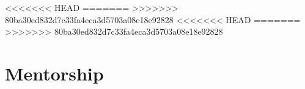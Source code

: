 \documentclass[letterpaper]{article}
\renewenvironment{itemize}{
  \begin{list}{}{
    \setlength{\leftmargin}{1.5em}
  }
}{
  \end{list}
}
\begin{document}
\begin{itemize}
\end{itemize}

<<<<<<< HEAD
=======
>>>>>>> 80ba30ed832d7c33fa4eca3d5703a08e18e92828
<<<<<<< HEAD
% 
=======
%
>>>>>>> 80ba30ed832d7c33fa4eca3d5703a08e18e92828

\section*{Mentorship}
\end{document}
